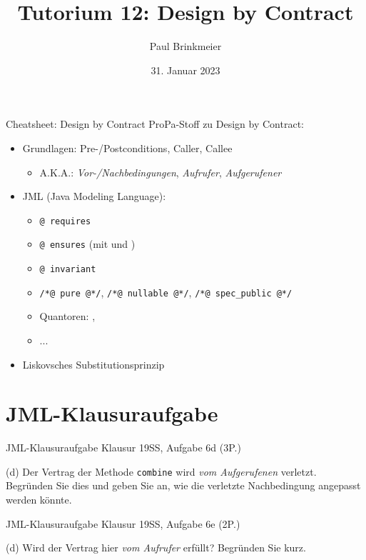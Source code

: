 \documentclass{beamer}
\title{Tutorium 12: Design by Contract}
\author{Paul Brinkmeier}
\institute{Tutorium Programmierparadigmen am KIT}
\date{31. Januar 2023}
\begin{document}
\begin{frame}
	\titlepage
\end{frame}

\begin{frame}{Cheatsheet: Design by Contract}
	ProPa-Stoff zu Design by Contract:

	\begin{itemize}
		\item Grundlagen: Pre-/Postconditions, Caller, Callee
		\begin{itemize}
                  \item A.K.A.: \emph{Vor-/Nachbedingungen}, \emph{Aufrufer}, \emph{Aufgerufener}
		\end{itemize}
		\item JML (Java Modeling Language):
		\begin{itemize}
			\item \texttt{@ requires}
			\item \texttt{@ ensures} (mit \texttt{\string\old} und \texttt{\string\result})
			\item \texttt{@ invariant}
			\item \texttt{/*@ pure @*/}, \texttt{/*@ nullable @*/}, \texttt{/*@ spec\_public @*/}
			\item Quantoren: \texttt{\string\forall}, \texttt{\string\exists}
			\item ...
		\end{itemize}
		\item Liskovsches Substitutionsprinzip
	\end{itemize}
\end{frame}

\section{JML-Klausuraufgabe}

\begin{frame}{JML-Klausuraufgabe}
    Klausur 19SS, Aufgabe 6d (3P.)

    {
    \footnotesize

    (d) Der Vertrag der Methode \texttt{combine} wird \emph{vom Aufgerufenen} verletzt.
    Begründen Sie dies und geben Sie an, wie die verletzte Nachbedingung angepasst werden könnte.
    }
\end{frame}

\begin{frame}{JML-Klausuraufgabe}
    Klausur 19SS, Aufgabe 6e (2P.)

    {
    \footnotesize

    (d) Wird der Vertrag hier \emph{vom Aufrufer} erfüllt?
    Begründen Sie kurz.
    }
\end{frame}
\end{document}
